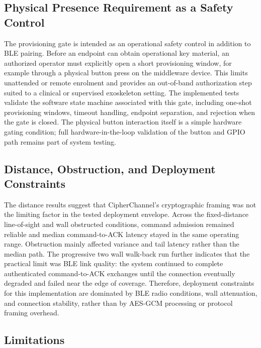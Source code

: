 \documentclass[journal]{IEEEtran}
\begin{document}
\subsection{Physical Presence Requirement as a Safety Control}

The provisioning gate is intended as an operational safety control in addition to BLE pairing. Before an endpoint can obtain operational key material, an authorized operator must explicitly open a short provisioning window, for example through a physical button press on the middleware device. This limits unattended or remote enrolment and provides an out-of-band authorization step suited to a clinical or supervised exoskeleton setting. The implemented tests validate the software state machine associated with this gate, including one-shot provisioning windows, timeout handling, endpoint separation, and rejection when the gate is closed. The physical button interaction itself is a simple hardware gating condition; full hardware-in-the-loop validation of the button and GPIO path remains part of system testing.

\subsection{Distance, Obstruction, and Deployment Constraints}
The distance results suggest that CipherChannel's cryptographic framing was not the limiting factor in the tested deployment envelope. Across the fixed-distance line-of-sight and wall obstructed conditions, command admission remained reliable and median command-to-ACK latency stayed in the same operating range. Obstruction mainly affected variance and tail latency rather than the median path. The progressive two wall walk-back run further indicates that the practical limit was BLE link quality: the system continued to complete authenticated command-to-ACK exchanges until the connection eventually degraded and failed near the edge of coverage. Therefore, deployment constraints for this implementation are dominated by BLE radio conditions, wall attenuation, and connection stability, rather than by AES-GCM processing or protocol framing overhead.

\subsection{Limitations}
\label{sec:limitations}
\end{document}
